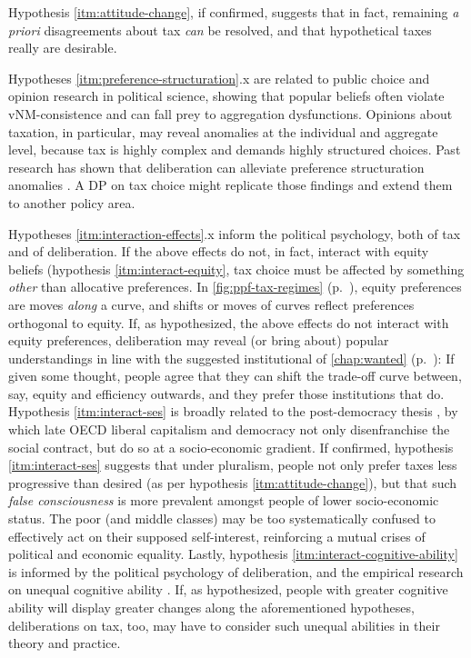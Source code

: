 Hypothesis \ref{itm:attitude-change}, if confirmed, suggests that in fact, remaining \emph{a priori} disagreements about tax \emph{can} be resolved, and that hypothetical taxes really are desirable.

Hypotheses \ref{itm:preference-structuration}.x are related to public choice and opinion research in political science, showing that popular beliefs often violate \gls{vNM}-consistence and can fall prey to aggregation dysfunctions.
Opinions about taxation, in particular, may reveal anomalies at the individual and aggregate level, because tax is highly complex and demands highly structured choices.
Past research has shown that deliberation can alleviate preference structuration anomalies  \citep{Farrar2003}.
A \gls{DP} on tax choice might replicate those findings and extend them to another policy area.

Hypotheses \ref{itm:interaction-effects}.x inform the political psychology, both of tax and of deliberation.
If the above effects do not, in fact, interact with equity beliefs (hypothesis \ref{itm:interact-equity}, tax choice must be affected by something \emph{other} than allocative preferences.
In \autoref{fig:ppf-tax-regimes} (p.~\pageref{fig:ppf-tax-regimes}), equity preferences are moves \emph{along} a curve, and shifts or moves of curves reflect preferences orthogonal to equity.
If, as hypothesized, the above effects do not interact with equity preferences, deliberation may reveal (or bring about) popular understandings in line with the suggested institutional  of \autoref{chap:wanted} (p.~\pageref{chap:wanted}):
If given some thought, people agree that they can shift the trade-off curve between, say, equity and efficiency outwards, and they prefer those institutions that do.
Hypothesis \ref{itm:interact-ses} is broadly related to the post-democracy thesis \citep{Crouch2004}, by which late \gls{OECD} liberal capitalism and democracy not only disenfranchise the social contract, but do so at a socio-economic gradient.
If confirmed, hypothesis \ref{itm:interact-ses} suggests that under pluralism, people not only prefer taxes less progressive than desired (as per hypothesis \ref{itm:attitude-change}), but that such \emph{false consciousness} is more prevalent amongst people of lower socio-economic status.
The poor (and middle classes) may be too systematically confused to effectively act on their supposed self-interest, reinforcing a mutual crises of political and economic equality.
Lastly, hypothesis \ref{itm:interact-cognitive-ability} is informed by the political psychology of deliberation, and the empirical research on unequal cognitive ability \citep{Rosenberg-2002-aa}.
If, as hypothesized, people with greater cognitive ability will display greater changes along the aforementioned hypotheses, deliberations on tax, too, may have to consider such unequal abilities in their theory and practice.

